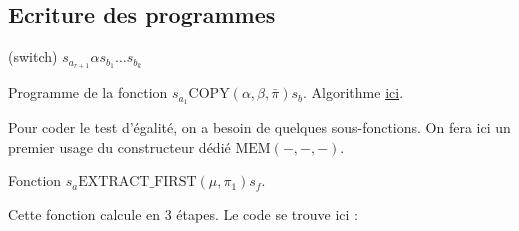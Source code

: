 \documentclass{report}
\begin{document}
\begin{appendices}
				
				\subsection{Ecriture des programmes}
				\label{subsec:ecriture_programmes}
				
				
				\begin{algorithm}[H]
					\label{prog:A_RAM_fn_COPY}
					
					
					(switch) 	$s_{a_{r+1}} \alpha s_{b_1} \dots s_{b_k}$\;
					
					
					
					\caption{Programme de la fonction $s_{a_1}\text{COPY}(\alpha, \beta, \bar{\pi}) s_b$. Algorithme \hyperref[algo:A_RAM_fn_COPY]{ici}.}
				\end{algorithm}
				
				\espace
				
				Pour coder le test d'égalité, on a besoin de quelques sous-fonctions. On fera ici un premier usage du constructeur dédié $\text{MEM}\left( -, -, -\right)$.
				
				\espace
				
				\begin{algorithm}[H]
					\label{algo:A_RAM_fn_extract_first}
					
					
					\caption{Fonction $s_a \text{EXTRACT\_FIRST}(\mu, \pi_1) s_f$. }
				\end{algorithm}
				
				\espace
				
				Cette fonction calcule en $3$ étapes. Le code se trouve ici :
				
				\espace
				
				\begin{algorithm}[H]
					\label{prog:A_RAM_fn_extract_first}
					

\end{algorithm}
\end{appendices}
\end{document}
